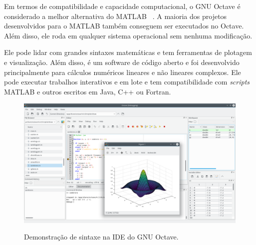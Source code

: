 Em termos de compatibilidade e capacidade computacional, o GNU Octave é considerado a melhor alternativa do MATLAB ~\cite{matlab-alts}. A maioria dos projetos desenvolvidos para o MATLAB também conseguem ser executados no Octave. Além disso, ele roda em qualquer sistema operacional sem nenhuma modificação. 

Ele pode lidar com grandes sintaxes matemáticas e tem ferramentas de plotagem e visualização. Além disso, é um software de código aberto e foi desenvolvido principalmente para cálculos numéricos lineares e não lineares complexos. Ele pode executar trabalhos interativos e em lote e tem compatibilidade com \emph{scripts} MATLAB e outros escritos em Java, C++ ou Fortran.

\begin{figure}[H]
	\caption{\small Demonstração de sintaxe na IDE do GNU Octave.}
	\centering
	\includegraphics[width=\textwidth]{figs/octave-ide.png}
	\label{f.matlab-syntax}
\end{figure}